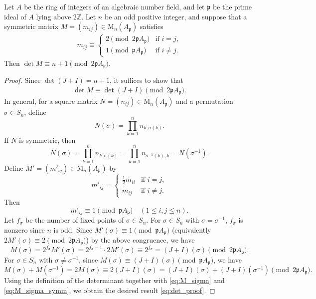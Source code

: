 \documentclass[10pt,a4paper]{amsart}
\newcommand{\Z}{\mathbb{Z}}
\newcommand{\p}{\mathfrak{p}}
\begin{document}
\begin{lemma} \label{lem:to_prove}
Let $A$ be the ring of integers of an algebraic number field, and let $\p$ be the prime ideal of $A$ lying above $2\Z$. Let $n$ be an odd positive integer, and suppose that a symmetric matrix $M = (m_{ij}) \in \mathrm{M}_n(A_{\p})$ satisfies
\begin{align}
m_{ij} \equiv
\begin{cases}
2 \pmod{2\p A_{\p}} & \text{if } i = j,\\
1 \pmod{\p A_{\p}} & \text{if } i \ne j.
\end{cases}
\label{eq:matrix_mij}
\end{align}
Then $\det M \equiv n+1 \pmod{2\p A_{\p}}$.
\end{lemma}

\begin{proof}
Since $\det(J + I) = n + 1$, it suffices to show that
\begin{align}
\det M \equiv \det(J + I) \pmod{2\p A_{\p}}.
\label{eq:det_proof}
\end{align}
In general, for a square matrix $N = (n_{ij}) \in \mathrm{M}_n(A_{\p})$ and a permutation $\sigma \in S_n$, define
\[
N(\sigma) = \prod_{k=1}^n n_{k,\sigma(k)}.
\]
If $N$ is symmetric, then 
\[
N(\sigma)=\prod_{k=1}^n n_{k,\sigma(k)}
=\prod_{k=1}^n n_{\sigma^{-1}(k),k}=N(\sigma^{-1}).
\]
Define $M' = (m'_{ij}) \in \mathrm{M}_n(A_{\p})$ by
\[
m'_{ij} =
\begin{cases}
\frac{1}{2} m_{ii} & \text{if } i = j,\\
m_{ij} & \text{if } i \ne j. 
\end{cases}
\]
Then
\[
m'_{ij} \equiv 1 \pmod{\p A_{\p}} \quad (1 \leq i, j \leq n).
\]
Let $f_{\sigma}$ be the number of fixed points of $\sigma \in S_n$. 
For $\sigma \in S_n$ with $\sigma = \sigma^{-1}$, $f_{\sigma}$ is nonzero since $n$ is odd. Since $M'(\sigma) \equiv 1 \pmod{\p A_{\p}}$ (equivalently $2M'(\sigma) \equiv 2 \pmod{2\p A_{\p}}$) by the above congruence, we have
\begin{equation}
M(\sigma) = 2^{f_{\sigma}} M'(\sigma)=2^{f_{\sigma}-1}\cdot 2M'(\sigma)  
\equiv 2^{f_{\sigma}} = (J + I)(\sigma)\pmod{2\p A_{\p}}. \label{eq:M_sigma}    
\end{equation}
For $\sigma \in S_n$ with $\sigma \neq \sigma^{-1}$, since $M(\sigma) \equiv (J + I)(\sigma) \pmod{\p A_{\p}}$, we have
\begin{equation}
M(\sigma) + M(\sigma^{-1}) = 2M(\sigma)
\equiv 2(J + I)(\sigma) 
= (J + I)(\sigma) + (J + I)(\sigma^{-1}) \pmod{2\p A_{\p}}. \label{eq:M_sigma_symm}
\end{equation}
Using the definition of the determinant together with \eqref{eq:M_sigma} and \eqref{eq:M_sigma_symm}, we obtain the desired result \eqref{eq:det_proof}.
\end{proof}
\end{document}
